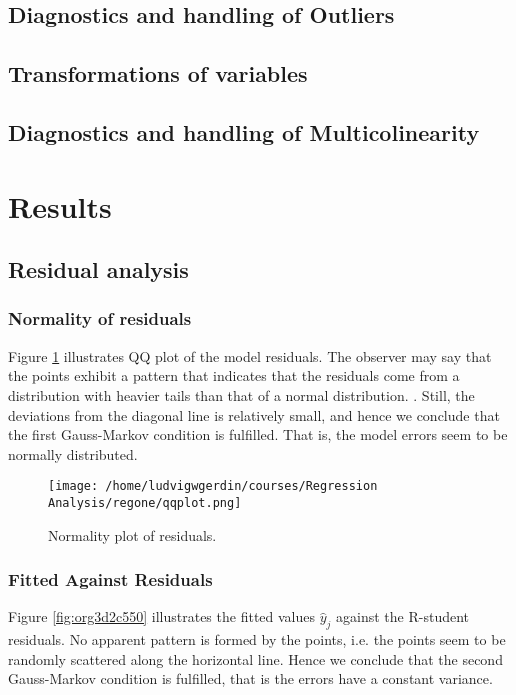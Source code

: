 \documentclass[11pt]{article}
\begin{document}
\subsection{Diagnostics and handling of Outliers}
\label{sec:org08cae6f}
\subsection{Transformations of variables}
\label{sec:org63c69f0}
\subsection{Diagnostics and handling of Multicolinearity}
\label{sec:orga5f5466}
\section{Results}
\label{sec:org06a3ff9}
\subsection{Residual analysis}
\label{sec:orgd93a1f3}
\subsubsection{Normality of residuals}
\label{sec:org52cb10e}

Figure \ref{fig:orgd8a1c69} illustrates QQ plot of the model residuals. The observer may say that the 
points exhibit a pattern that indicates that the residuals come from a distribution with heavier tails
than that of a normal distribution. 
\cite{Montgomery2012}. Still, the deviations from the diagonal line is relatively small, and hence
we conclude that the first Gauss-Markov condition is fulfilled. That is, the model errors seem to be 
normally distributed.

\begin{figure}[htbp]
\centering
\texttt{[image: /home/ludvigwgerdin/courses/Regression Analysis/regone/qqplot.png]}
\caption{\label{fig:orgd8a1c69}
Normality plot of residuals.}
\end{figure}

\subsubsection{Fitted Against Residuals}
\label{sec:orgd6db02b}

Figure \ref{fig:org3d2c550} illustrates the fitted values \(\hat y_j\) against the R-student residuals. No apparent 
pattern is formed by the points, i.e. the points seem to be randomly scattered along the horizontal line.
Hence we conclude that the second Gauss-Markov condition is fulfilled, that is the errors have a constant 
variance.
\end{document}
